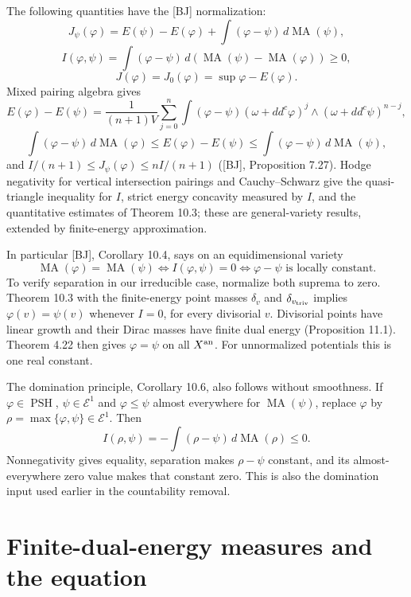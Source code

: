\documentclass[11pt]{article}
\begin{document}
The following quantities have the {[}BJ{]} normalization:
\[J_\psi(\varphi)=E(\psi)-E(\varphi)+\int(\varphi-\psi)\,d\operatorname{MA}(\psi),\]
\[I(\varphi,\psi)=\int(\varphi-\psi)\,d(\operatorname{MA}(\psi)-\operatorname{MA}(\varphi))\geq0,\]
\[J(\varphi)=J_0(\varphi)=\sup\varphi-E(\varphi).\] Mixed pairing
algebra gives
\[E(\varphi)-E(\psi)=\frac1{(n+1)V}\sum_{j=0}^n\int(\varphi-\psi)(\omega+dd^c\varphi)^j\wedge(\omega+dd^c\psi)^{n-j},\]
\[\int(\varphi-\psi)\,d\operatorname{MA}(\varphi)
\leq E(\varphi)-E(\psi)\leq\int(\varphi-\psi)\,d\operatorname{MA}(\psi),\]
and \(I/(n+1)\leq J_\psi(\varphi)\leq nI/(n+1)\) ({[}BJ{]}, Proposition
7.27). Hodge negativity for vertical intersection pairings and
Cauchy--Schwarz give the quasi-triangle inequality for \(I\), strict
energy concavity measured by \(I\), and the quantitative estimates of
Theorem 10.3; these are general-variety results, extended by
finite-energy approximation.

In particular {[}BJ{]}, Corollary 10.4, says on an equidimensional
variety \[\operatorname{MA}(\varphi)=\operatorname{MA}(\psi)
\Longleftrightarrow I(\varphi,\psi)=0
\Longleftrightarrow \varphi-\psi\text{ is locally constant}.\] To verify
separation in our irreducible case, normalize both suprema to zero.
Theorem 10.3 with the finite-energy point masses \(\delta_v\) and
\(\delta_{v_{\rm triv}}\) implies \(\varphi(v)=\psi(v)\) whenever
\(I=0\), for every divisorial \(v\). Divisorial points have linear
growth and their Dirac masses have finite dual energy (Proposition
11.1). Theorem 4.22 then gives \(\varphi=\psi\) on all \(X^{\rm an}\).
For unnormalized potentials this is one real constant.

The domination principle, Corollary 10.6, also follows without
smoothness. If \(\varphi\in\operatorname{PSH}\), \(\psi\in\mathcal E^1\)
and \(\varphi\leq\psi\) almost everywhere for
\(\operatorname{MA}(\psi)\), replace \(\varphi\) by
\(\rho=\max\{\varphi,\psi\}\in\mathcal E^1\). Then
\[I(\rho,\psi)=-\int(\rho-\psi)\,d\operatorname{MA}(\rho)\leq0.\]
Nonnegativity gives equality, separation makes \(\rho-\psi\) constant,
and its almost-everywhere zero value makes that constant zero. This is
also the domination input used earlier in the countability removal.

\section{Finite-dual-energy measures and the
equation}\label{finite-dual-energy-measures-and-the-equation}
\end{document}
